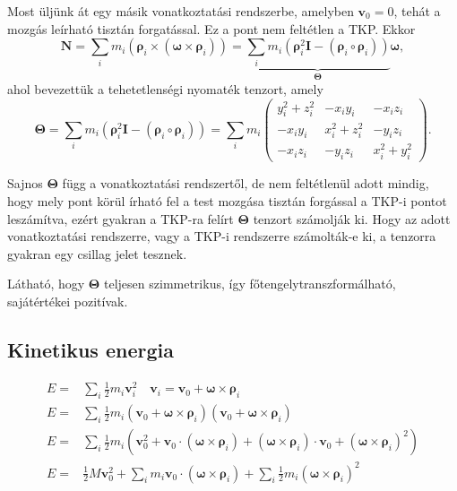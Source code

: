 \documentclass[12pt,a4paper]{scrartcl}
\let\mathbf\bm
\begin{document}
Most üljünk át egy másik vonatkoztatási rendszerbe, amelyben ${{\mathbf{v}}_0} = 0$, tehát a mozgás leírható tisztán forgatással. Ez a pont nem feltétlen a TKP. Ekkor
\[{\mathbf{N}} = \sum\limits_i {{m_i}\left( {{{\mathbf{\rho }}_i} \times \left( {{\mathbf{\omega }} \times {{\mathbf{\rho }}_i}} \right)} \right)}  = \underbrace {\sum\limits_i {{m_i}\left( {{\mathbf{\rho }}_i^2{\mathbf{I}} - \left( {{{\mathbf{\rho }}_i} \circ {{\mathbf{\rho }}_i}} \right)} \right)} }_{\mathbf{\Theta }}{\mathbf{\omega }},\]
ahol bevezettük a tehetetlenségi nyomaték tenzort, amely
\[{\mathbf{\Theta }} = \sum\limits_i {{m_i}\left( {{\mathbf{\rho }}_i^2{\mathbf{I}} - \left( {{{\mathbf{\rho }}_i} \circ {{\mathbf{\rho }}_i}} \right)} \right)}  = \sum\limits_i {{m_i}\left( {\begin{array}{*{20}{c}}
  {y_i^2 + z_i^2}&{ - {x_i}{y_i}}&{ - {x_i}{z_i}} \\ 
  { - {x_i}{y_i}}&{x_i^2 + z_i^2}&{ - {y_i}{z_i}} \\ 
  { - {x_i}{z_i}}&{ - {y_i}{z_i}}&{x_i^2 + y_i^2} 
\end{array}} \right)}. \]

Sajnos ${\mathbf{\Theta }}$ függ a vonatkoztatási rendszertől, de nem feltétlenül adott mindig, hogy mely pont körül írható fel a test mozgása tisztán forgással a TKP-i pontot leszámítva, ezért gyakran a TKP-ra felírt ${\mathbf{\Theta }}$ tenzort számolják ki. Hogy az adott vonatkoztatási rendszerre, vagy a TKP-i rendszerre számolták-e ki, a tenzorra gyakran egy csillag jelet tesznek.

Látható, hogy ${\mathbf{\Theta }}$ teljesen szimmetrikus, így főtengelytranszformálható, sajátértékei pozitívak.

\subsection{Kinetikus energia}
\[\begin{aligned}
  E =  & \sum\limits_i {\frac{1}{2}{m_i}{\mathbf{v}}_i^2} \quad {{\mathbf{v}}_i} = {{\mathbf{v}}_0} + {\mathbf{\omega }} \times {{\mathbf{\rho }}_i} \\ 
  E =  & \sum\limits_i {\frac{1}{2}{m_i}\left( {{{\mathbf{v}}_0} + {\mathbf{\omega }} \times {{\mathbf{\rho }}_i}} \right)\left( {{{\mathbf{v}}_0} + {\mathbf{\omega }} \times {{\mathbf{\rho }}_i}} \right)}  \\ 
  E =  & \sum\limits_i {\frac{1}{2}{m_i}\left( {{\mathbf{v}}_0^2 + {{\mathbf{v}}_0} \cdot \left( {{\mathbf{\omega }} \times {{\mathbf{\rho }}_i}} \right) + \left( {{\mathbf{\omega }} \times {{\mathbf{\rho }}_i}} \right) \cdot {{\mathbf{v}}_0} + {{\left( {{\mathbf{\omega }} \times {{\mathbf{\rho }}_i}} \right)}^2}} \right)}  \\ 
  E =  & \frac{1}{2}M{\mathbf{v}}_0^2 + \sum\limits_i {{m_i}{{\mathbf{v}}_0} \cdot \left( {{\mathbf{\omega }} \times {{\mathbf{\rho }}_i}} \right)}  + \sum\limits_i {\frac{1}{2}{m_i}{{\left( {{\mathbf{\omega }} \times {{\mathbf{\rho }}_i}} \right)}^2}}  \\ 
\end{aligned} \]
\end{document}

